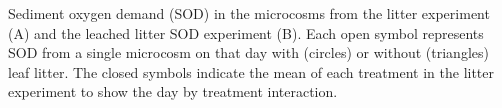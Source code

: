 \label{fig:sod}

Sediment oxygen demand (SOD) in the microcosms from the litter experiment (A) and the leached litter SOD experiment (B). Each open symbol represents SOD from a single microcosm on that day with (circles) or without (triangles) leaf litter. The closed symbols indicate the mean of each treatment in the litter experiment to show the day by treatment interaction.